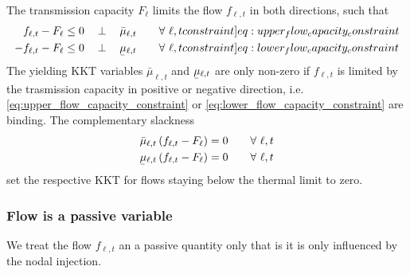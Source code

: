 \documentclass[11pt]{article}
\newcommand{\ubar}[1]{\underaccent{\bar}{#1}}
\newcommand{\capacityFlow}{F_{\ell}}
\newcommand{\mulowerflow}{\ubar{\mu}_{\ell,t}}
\newcommand{\muupperflow}{\bar{\mu}_{\ell,t}}
\newcommand{\flow}{f_{\ell,t}}
\newcommand{\resultsin}[1]{\hspace{12pt} \bot  \hspace{12pt} #1}
\newcommand{\Forall}[1]{\hspace{20pt} \forall \,\, #1 }
\begin{document}
The transmission capacity $\capacityFlow$ limits the flow $\flow$ in both directions, such that 
\begin{align}
 \flow - \capacityFlow &\le 0 \resultsin{\muupperflow} \Forall{\ell,t} 
 \label[constraint]{eq:upper_flow_capacity_constraint} \\
 - \flow - \capacityFlow &\le 0 \resultsin{\mulowerflow} \Forall{\ell,t} 
 \label[constraint]{eq:lower_flow_capacity_constraint}
\end{align}
The yielding KKT variables $\muupperflow$ and $\mulowerflow$ are only non-zero if $\flow$ is limited by the trasmission capacity in positive or negative direction, i.e. \cref{eq:upper_flow_capacity_constraint} or \cref{eq:lower_flow_capacity_constraint} are binding. The complementary slackness 
\begin{align}
 \muupperflow \left( \flow - \capacityFlow \right)  &= 0 \Forall{\ell,t}
 \label{eq:complementary_slackness_upper_flow} \\
 \mulowerflow \left( \flow - \capacityFlow \right) &=  0 \Forall{\ell,t}
 \label{eq:complementary_slackness_lower_flow} 
\end{align}
set the respective KKT for flows staying below the thermal limit to zero. 
\\

\subsubsection*{Flow is a passive variable}
We treat the flow $\flow$ an a passive quantity only that is it is only influenced by the nodal injection.
\end{document}
